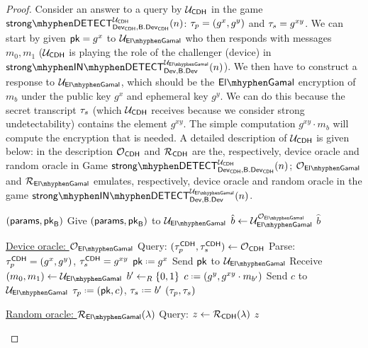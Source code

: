 \begin{proof}
Consider an answer to a query by $\user_{\CDH}$ in the game $\strongdetect{\dev_{\CDH}}{\bbdev_{\CDH}}{\user_{\CDH}}$: $\tau_p=(g^x,g^y)$ and $\tau_s=g^{xy}$. We can start by given $\mathsf{pk} = g^x$ to $\user_{\elGamal}$ who then responds with messages $m_0,m_1$ ($\user_{\CDH}$ is playing the role of the challenger (device) in $\instrongdetect{\dev}{\bbdev}{\user_{\elGamal}}$). We then have to construct a response to $\user_{\elGamal}$, which should be the $\elGamal$ encryption of $m_b$ under the public key $g^x$ and ephemeral key $g^y$. We can do this because the secret transcript $\tau_s$ (which $\user_{\CDH}$ receives because we consider strong undetectability) contains the element $g^{xy}$. The simple computation $g^{xy}\cdot m_b$ will compute the encryption that is needed. A detailed description of $\user_{\CDH}$ is given below: in the description $\operatorname{\mathcal{O}}_{\mathsf{CDH}}$ and $\operatorname{\mathcal{R}}_{\mathsf{CDH}}$ are the, respectively, device oracle and random oracle in Game $\strongdetect{\dev_{\CDH}}{\bbdev_{\CDH}}{\user_{\CDH}}$; $\oracle_{\elGamal}$ and $\RO_{\elGamal}$ emulates, respectively, device oracle and random oracle in the game $\instrongdetect{\dev}{\bbdev}{\user_{\elGamal}}$.

\vspace*{-.3cm}
\begin{Algorithm}[]{6cm}
\captionUser
\caption{$\user_{\CDH}$}
\label{alg:elGamal1}
\begin{algorithmic}[1]
\Require $(\mathsf{params},\mathsf{pk}_{\mathsf{B}})$ 
\State Give $(\mathsf{params},\mathsf{pk}_{\mathsf{B}})$ to $\user_{\elGamal}$
\State $\hat{b} \leftarrow \user_{\elGamal}^{\oracle_{\elGamal}}$
\State \Ret $\hat{b}$
\Statex\hrulefill
\end{algorithmic}
\begin{algorithmic}[1]
\Statex \underline{Device oracle: \textbf{$\oracle_{\elGamal}$}}
\Statex
\State Query: $(\tau_p^{\mathsf{CDH}},\tau_s^{\mathsf{CDH}})\leftarrow \operatorname{\mathcal{O}}_{\mathsf{CDH}}$
\State Parse: $\tau_p^{\mathsf{CDH}} = (g^x,g^y)$, $\tau_s^{\mathsf{CDH}} = g^{xy}$
\State $\pk \defeq g^x$
\State Send $\mathsf{pk}$ to $\user_{\elGamal}$
\State Receive $(m_0,m_1)\leftarrow \user_{\elGamal}$
\State $b'\leftarrow_R\{0,1\}$
\State $c \defeq (g^y,g^{xy}\cdot m_{b'})$
\State Send $c$ to $\user_{\elGamal}$
\State $\ptrans \defeq (\pk,c)$, $\strans \defeq b'$
\State \Ret $(\tau_p,\tau_s)$
\end{algorithmic}
\begin{algorithmic}[1]
\Statex \underline{Random oracle: \textbf{$\RO_{\elGamal}(\lambda)$}}
\Statex
\State Query: $z\leftarrow\operatorname{\mathcal{R}}_{\mathsf{CDH}}(\lambda)$
\State \Ret $z$
\end{algorithmic}
\end{Algorithm}


\end{proof}
